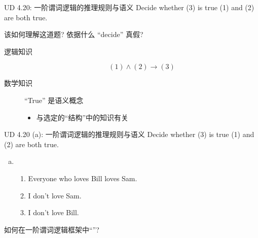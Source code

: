 
\begin{frame}{}
\end{frame}

\begin{frame}{}
  \begin{exampleblock}{UD 4.20: 一阶谓词逻辑的推理规则与语义}
    Decide whether (3) is true  (1) and (2) are both true.
  \end{exampleblock}

  \pause
  \vspace{0.30cm}
   该如何理解这道题? 依据什么 ``decide'' 真假?
  
  \pause
  \begin{description}
    \item[逻辑知识] 
      \[
	(1) \land (2) \to (3)
      \]
    \pause
    \item[数学知识] ``True'' 是语义概念 
      \begin{itemize}
	\item 与选定的``结构''中的知识有关
      \end{itemize}
  \end{description}

  \pause
\end{frame}

\begin{frame}{}
  \begin{exampleblock}{UD 4.20 (a): 一阶谓词逻辑的推理规则与语义}
    Decide whether (3) is true  (1) and (2) are both true.

    \begin{enumerate}[(a)]
      \item 
	\begin{enumerate}[(1)]
	  \item Everyone who loves Bill loves Sam.
	  \item I don't love Sam.
	  \item I don't love Bill.
	\end{enumerate}
    \end{enumerate}
  \end{exampleblock}

  \vspace{0.50cm}
  \pause
  \begin{center}
    { 如何在一阶谓词逻辑框架中``''?}
  \end{center}
\end{frame}

